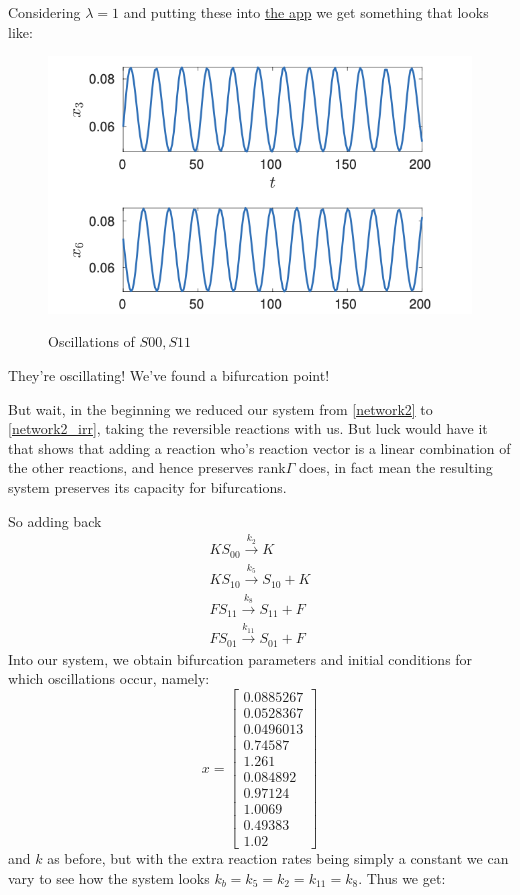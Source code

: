 Considering $\lambda = 1$ and putting these into \href{https://github.com/viktorashi/Open-CoNtRol}{the app} we get something that looks like:
\begin{figure}[H]
	\includegraphics[width=13cm]{math_pics/oscillations.png}
	\centering
	\label{fig:x3_x6_osccilations}
	\caption{Oscillations of $S00, S11$}
\end{figure}

They're oscillating! We've found a bifurcation point!

But wait, in the beginning we reduced our system from \ref{network2} to \ref{network2_irr}, taking the reversible reactions with us. But luck would have it that \cite{banaji2017} shows that adding a reaction who's reaction vector is a linear combination of the other reactions, and hence preserves rank$\Gamma$ does, in fact mean the resulting system preserves its capacity for bifurcations.

So adding back
\begin{gather*}
	KS_{00} \xrightarrow{k_2} K \\
	KS_{10} \xrightarrow{k_5} S_{10} + K \\
	FS_{11} \xrightarrow{k_8} S_{11} + F \\
	FS_{01} \xrightarrow{k_{11}} S_{01} + F
\end{gather*}
Into our system, we obtain bifurcation parameters and initial conditions for which oscillations occur, namely:
\[
	x =
	\begin{bmatrix*}
		0.0885267\\
		0.0528367\\
		0.0496013\\
		0.74587\\
		1.261\\
		0.084892\\
		0.97124\\
		1.0069\\
		0.49383\\
		1.02
	\end{bmatrix*}
\]
and $k$ as before, but with the extra reaction rates being simply a constant we can vary to see how the system looks $k_b = k_5 = k_2 = k_{11} = k_8$. Thus we get:

